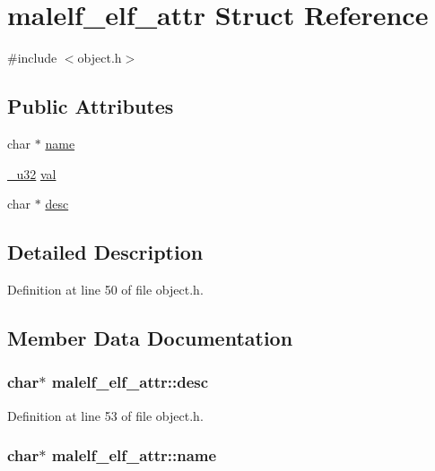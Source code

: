 \hypertarget{structmalelf__elf__attr}{
\section{malelf\_\-elf\_\-attr Struct Reference}
\label{structmalelf__elf__attr}
}


{\ttfamily \#include $<$object.h$>$}

\subsection*{Public Attributes}
\begin{DoxyCompactItemize}
\item 
char $\ast$ \hyperlink{structmalelf__elf__attr_a94413655d886dc859f66668fbf04be95}{name}
\item 
\hyperlink{types_8h_a07491c35a48354e0e7b56974a04cc3de}{\_\-u32} \hyperlink{structmalelf__elf__attr_af49e74a88d3f8f78a0ab58ba788afcbc}{val}
\item 
char $\ast$ \hyperlink{structmalelf__elf__attr_a04fe708024668b47fbc67edb611c3e45}{desc}
\end{DoxyCompactItemize}


\subsection{Detailed Description}


Definition at line 50 of file object.h.



\subsection{Member Data Documentation}
\hypertarget{structmalelf__elf__attr_a04fe708024668b47fbc67edb611c3e45}{
\subsubsection[{desc}]{\setlength{\rightskip}{0pt plus 5cm}char$\ast$ {\bf malelf\_\-elf\_\-attr::desc}}}
\label{structmalelf__elf__attr_a04fe708024668b47fbc67edb611c3e45}


Definition at line 53 of file object.h.

\hypertarget{structmalelf__elf__attr_a94413655d886dc859f66668fbf04be95}{
\subsubsection[{name}]{\setlength{\rightskip}{0pt plus 5cm}char$\ast$ {\bf malelf\_\-elf\_\-attr::name}}}
\label{structmalelf__elf__attr_a94413655d886dc859f66668fbf04be95}


